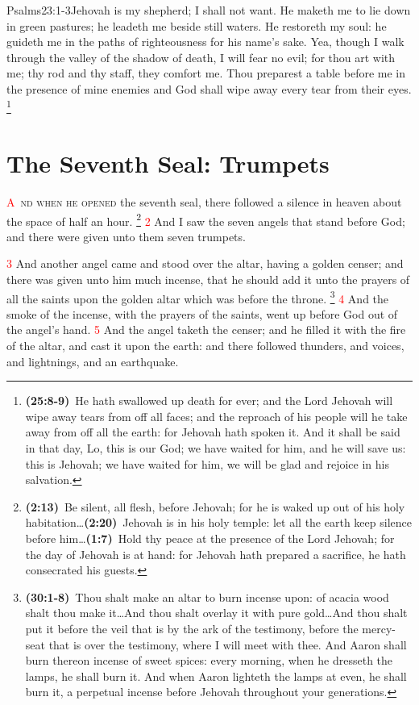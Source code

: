 \documentclass[12pt,twoside]{memoir}
\newcommand{\cbibleref}[3]{\textbf{\ibibleverse{#1}(#2)}\ {#3}}
\newcommand{\cbiblefoot}[3]{\footnote{\cbibleref{#1}{#2}{#3}}}
\newcommand{\cbiblefoottrio}[9]{\footnote{\cbibleref{#1}{#2}{#3}\ldots \cbibleref{#4}{#5}{#6}\ldots \cbibleref{#7}{#8}{#9}}}
\newcommand{\vnum}[1]{\textcolor{red}{\normalsize{#1}}}
\begin{document}
				{Psalms}{23:1-3}{Jehovah is my shepherd; I shall not want. He maketh me to lie down in green pastures; he leadeth me beside still waters. He restoreth my soul: he guideth me in the paths of righteousness for his name’s sake. Yea, though I walk through the valley of the shadow of death, I will fear no evil; for thou art with me; thy rod and thy staff, they comfort me. Thou preparest a table before me in the presence of mine enemies}
 and God shall wipe away every tear from their eyes.%
 	\cbiblefoot{Isaiah}{25:8-9}{He hath swallowed up death for ever; and the Lord Jehovah will wipe away tears from off all faces; and the reproach of his people will he take away from off all the earth: for Jehovah hath spoken it. And it shall be said in that day, Lo, this is our God; we have waited for him, and he will save us: this is Jehovah; we have waited for him, we will be glad and rejoice in his salvation.}


\chapter{The Seventh Seal: Trumpets}
\lettrine[lines=3]{\textcolor{red}{A}}{\ nd when he opened} the seventh seal, there followed a silence in heaven about the space of half an hour.%
	\cbiblefoottrio{Zechariah}{2:13}{Be silent, all flesh, before Jehovah; for he is waked up out of his holy habitation}%
				{Habakkuk}{2:20}{Jehovah is in his holy temple: let all the earth keep silence before him}%
				{Zephaniah}{1:7}{Hold thy peace at the presence of the Lord Jehovah; for the day of Jehovah is at hand: for Jehovah hath prepared a sacrifice, he hath consecrated his guests.} %
\vnum{2} And I saw the seven angels that stand before God; and there were given unto them seven trumpets.

\vnum{3} And another angel came and stood over the altar, having a golden censer; and there was given unto him much incense, that he should add it unto the prayers of all the saints upon the golden altar which was before the throne.%
	\cbiblefoot{Exodus}{30:1-8}{Thou shalt make an altar to burn incense upon: of acacia wood shalt thou make it\ldots And thou shalt overlay it with pure gold\ldots And thou shalt put it before the veil that is by the ark of the testimony, before the mercy-seat that is over the testimony, where I will meet with thee. And Aaron shall burn thereon incense of sweet spices: every morning, when he dresseth the lamps, he shall burn it. And when Aaron lighteth the lamps at even, he shall burn it, a perpetual incense before Jehovah throughout your generations.} %
\vnum{4} And the smoke of the incense, with the prayers of the saints, went up before God out of the angel’s hand. %
\vnum{5} And the angel taketh the censer; and he filled it with the fire of the altar, and cast it upon the earth: and there followed thunders, and voices, and lightnings, and an earthquake.
\end{document}
